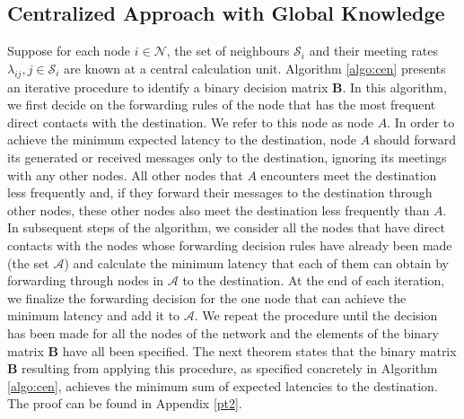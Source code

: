 \documentclass[journal,onecolumn,11pt]{IEEEtran}
\theoremstyle{plain}
\theoremstyle{definition}
\begin{document}
\subsection{Centralized Approach with Global Knowledge}
Suppose for each node $i \in \mathcal{N}$, the set of neighbours
$\mathcal{S}_i$ and their meeting rates $\lambda_{ij}, j \in
\mathcal{S}_i$ are known at a central calculation unit. Algorithm
\ref{algo:cen} presents an iterative procedure to identify a binary
decision matrix $\mathbf{B}$. In this algorithm, we first decide on
the forwarding rules of the node that has the most frequent direct
contacts with the destination. We refer to this node as node $A$. In
order to achieve the minimum expected latency to the destination, node
$A$ should forward its generated or received messages only to the
destination, ignoring its meetings with any other nodes. All other
nodes that $A$ encounters meet the destination less frequently and, if
they forward their messages to the destination through other nodes,
these other nodes also meet the destination less frequently than
$A$. In subsequent steps of the algorithm, we consider all the nodes
that have direct contacts with the nodes whose forwarding decision
rules have already been made (the set $\mathcal{A}$) and calculate the
minimum latency that each of them can obtain by forwarding through
nodes in $\mathcal{A}$ to the destination. At the end of each
iteration, we finalize the forwarding decision for the one node that
can achieve the minimum latency and add it to $\mathcal{A}$. We repeat
the procedure until the decision has been made for all the nodes of
the network and the elements of the binary matrix $\mathbf{B}$ have
all been specified.  The next theorem states that the binary matrix
$\mathbf{B}$ resulting from applying this procedure, as specified
concretely in Algorithm \ref{algo:cen}, achieves the minimum sum of
expected latencies to the destination. The proof can be found in
Appendix \ref{pt2}.
\end{document}
